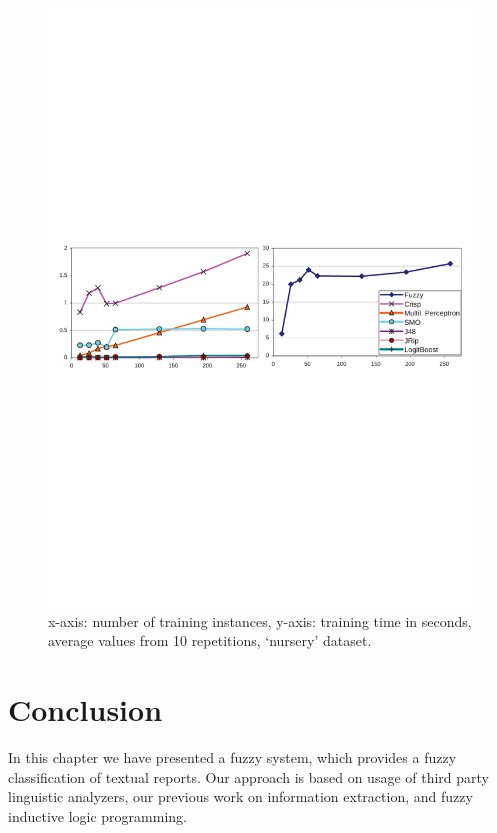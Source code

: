 \begin{figure}
\centerline{\includegraphics[width=\hsize]{learning_speed}}
\caption{x-axis: number of training instances, y-axis: training time in seconds, average values from 10 repetitions, `nursery' dataset.}
\label{img:learning_speed}
\end{figure}



\section{Conclusion} \label{sec:conclusion}
In this chapter we have presented a fuzzy system, which provides a fuzzy classification of textual reports. Our approach is based on usage of third party linguistic analyzers, our previous work on information extraction, and fuzzy inductive logic programming.

